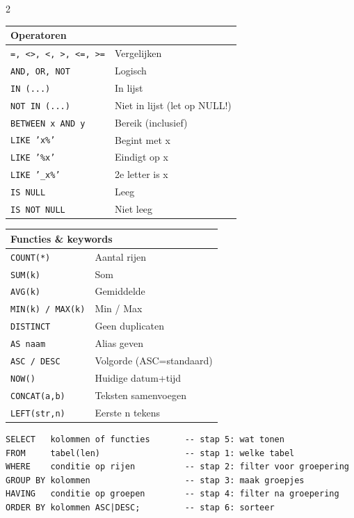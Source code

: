 \documentclass[10pt,a4paper]{article}
\begin{document}
\begin{multicols}{2}
{\footnotesize\begin{tabular}{ll}
\toprule
\multicolumn{2}{l}{\textbf{Operatoren}} \\ \midrule
\texttt{=, <>, <, >, <=, >=} & Vergelijken \\
\texttt{AND, OR, NOT} & Logisch \\
\texttt{IN (...)} & In lijst \\
\texttt{NOT IN (...)} & Niet in lijst (let op NULL!) \\
\texttt{BETWEEN x AND y} & Bereik (inclusief) \\
\texttt{LIKE 'x\%'} & Begint met x \\
\texttt{LIKE '\%x'} & Eindigt op x \\
\texttt{LIKE '\_x\%'} & 2e letter is x \\
\texttt{IS NULL} & Leeg \\
\texttt{IS NOT NULL} & Niet leeg \\
\bottomrule
\end{tabular}}

\columnbreak

{\footnotesize\begin{tabular}{ll}
\toprule
\multicolumn{2}{l}{\textbf{Functies \& keywords}} \\ \midrule
\texttt{COUNT(*)} & Aantal rijen \\
\texttt{SUM(k)} & Som \\
\texttt{AVG(k)} & Gemiddelde \\
\texttt{MIN(k) / MAX(k)} & Min / Max \\
\texttt{DISTINCT} & Geen duplicaten \\
\texttt{AS naam} & Alias geven \\
\texttt{ASC / DESC} & Volgorde (ASC=standaard) \\
\texttt{NOW()} & Huidige datum+tijd \\
\texttt{CONCAT(a,b)} & Teksten samenvoegen \\
\texttt{LEFT(str,n)} & Eerste n tekens \\
\bottomrule
\end{tabular}}
\end{multicols}

\begin{tcolorbox}[notebox,title=Algemeen formaat --- schrijfvolgorde]
\begin{lstlisting}
SELECT   kolommen of functies       -- stap 5: wat tonen
FROM     tabel(len)                 -- stap 1: welke tabel
WHERE    conditie op rijen          -- stap 2: filter voor groepering
GROUP BY kolommen                   -- stap 3: maak groepjes
HAVING   conditie op groepen        -- stap 4: filter na groepering
ORDER BY kolommen ASC|DESC;         -- stap 6: sorteer
\end{lstlisting}
\end{tcolorbox}
\end{document}

